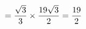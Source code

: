 \documentclass[preview]{standalone}
\begin{document}
\begin{align*}
\special{dvisvgm:raw <g id='unique000'>}=\frac{\sqrt{3}}{3}\times\frac{19\sqrt{3}}{2}=\frac{19}{2}\special{dvisvgm:raw </g>}
\end{align*}
\end{document}
